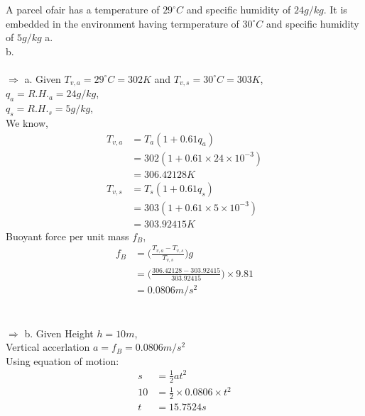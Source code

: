 \documentclass[fleqn,10pt]{SelfArx} %
\begin{document}
\begin{question}[label=q:6.1]{A parcel ofair has a temperature of $29^\circ C$ and specific humidity of $24 g/kg$. It is embedded in the environment having termperature of $30^\circ C$ and specific humidity of $5g/kg$ \newline
        a.  \\
        b. \\  \\ 
    }
    $\Rightarrow$ a. Given $T_{v,a} =29^\circ C= 302K$ and $T_{v,s} =30^\circ C= 303K$,\\ 
                    $q_a=R.H._a = 24g/kg$, \\
                    $q_s=R.H._s = 5g/kg$,\\ 
        We know, 
        \begin{align*}
            T_{v,a} &= T_a(1+0.61q_a)\\
                    &= 302(1+0.61 \times 24 \times 10^{-3}) \\
                    &= 306.42128 K \\
            T_{v,s} &= T_s(1+0.61q_s)\\
                    &= 303(1+0.61 \times 5 \times 10^{-3}) \\
                    &= 303.92415 K
        \end{align*}
        Buoyant force per unit mass $f_B$,
        \begin{align*}
            f_B &= \Big(\frac{T_{v,a} - T_{v,s}}{T_{v,s}}\Big)g\\
                &= \Big(\frac{306.42128 - 303.92415}{303.92415}\Big)\times 9.81\\
                &= 0.0806 m/s^2
        \end{align*}
     \\  \\
    $\Rightarrow$ b. Given Height $h=10m$, \\
                           Vertical accerlation $a=f_B=0.0806 m/s^2$ \\
        Using equation of motion:
        \begin{align*}
            s &= \frac{1}{2} at^2 \\
            10 &= \frac{1}{2} \times 0.0806 \times t^2 \\
            t &= 15.7524 s
        \end{align*}
     \\  \\
\end{question}
\end{document}
